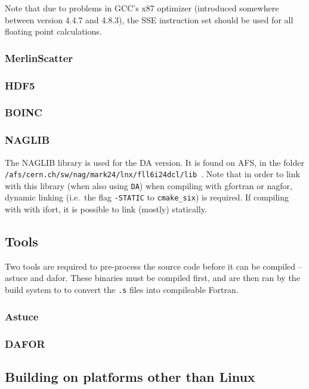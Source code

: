 \documentclass[english]{article}
\begin{document}
Note that due to problems in GCC's x87 optimizer (introduced somewhere between version 4.4.7 and 4.8.3), the SSE instruction set should be used for all floating point calculations.

\subsubsection{MerlinScatter}

\subsubsection{HDF5}

\subsubsection{BOINC}

\subsubsection{NAGLIB}
\label{sec:building:libs:naglib}
The NAGLIB library  is used for the DA version.
It is found on AFS, in the folder \texttt{/afs/cern.ch/sw/nag/mark24/lnx/fll6i24dcl/lib}~.
Note that in order to link with this library (when also using \texttt{DA}) when compiling with gfortran or nagfor, dynamic linking (i.e.\ the flag \texttt{-STATIC} to \texttt{cmake\_six}) is required.
If compiling with with ifort, it is possible to link (mostly) statically.

\subsection{Tools}

Two tools are required to pre-process the source code before it can be compiled -- astuce and dafor.
These binaries must be compiled first, and are then ran by the build system to to convert the \texttt{.s} files into compileable Fortran.

\subsubsection{Astuce}

\subsubsection{DAFOR}

\subsection{Building on platforms other than Linux}
\end{document}
